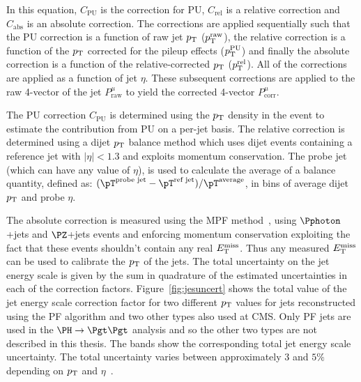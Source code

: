 In this equation, $C_{\text{PU}}$ is the correction for \ac{PU},
$C_{\text{rel}}$ is a relative correction and $C_{\text{abs}}$ is an absolute
correction. The corrections are applied sequentially such that the \ac{PU}
correction is a function of raw jet $p_{\mathrm{T}}$ ($p_{\mathrm{T}}^{\text{raw}}$),
the relative correction is a function
of the $p_{\mathrm{T}}$ corrected for the pileup effects ($p_{\mathrm{T}}^{\text{PU}}$) and finally
the absolute correction is a function of the relative-corrected $p_{\mathrm{T}}$
($p_{\mathrm{T}}^{\text{rel}}$). All of the corrections are applied as a function of
jet $\eta$. These subsequent corrections are applied to the raw
4-vector of the jet $P_{\text{raw}}^{\mu}$ to yield the corrected 4-vector
$P_{\text{corr}}^{\mu}$.

The \ac{PU} correction $C_{\text{PU}}$ is determined using the $p_{\mathrm{T}}$ density in the event to
estimate the contribution from \ac{PU} on a per-jet basis. The relative
correction is determined using a dijet $p_{\mathrm{T}}$ balance method which uses dijet
events containing a reference jet with $|\eta| < 1.3$ and exploits momentum conservation.
The probe jet (which can have any value of $\eta$), is used to calculate the
average of a balance quantity, defined as:
$(\pT^{\text{probe jet}}-\pT^{\text{ref jet}})/\pT^{\text{average}}$, in bins of
average dijet $p_{\mathrm{T}}$ and probe $\eta$.  

The absolute correction is measured
using the \ac{MPF} method~\cite{Abe:1992sj}, using $\Pphoton$+jets and $\PZ$+jets
events and enforcing momentum conservation exploiting the fact that these
events shouldn't contain any real $E_{\mathrm{T}}^{\text{miss}}$. Thus any measured $E_{\mathrm{T}}^{\text{miss}}$ can be used to
calibrate the $p_{\mathrm{T}}$ of the jets. The total uncertainty on the jet energy scale
is given by the sum in quadrature of the estimated uncertainties in each of the
correction factors. Figure~\ref{fig:jesuncert} shows the total value of the jet
energy scale correction factor for two different $p_{\mathrm{T}}$ values for jets
reconstructed using the \ac{PF} algorithm and two other types also used at CMS.
Only \ac{PF} jets are used in the $\HToTauTau$ analysis and so the other two
types are not described in this thesis. The bands show the corresponding total jet 
energy scale uncertainty. The total uncertainty varies between approximately $3$ and 
$5\%$ depending on $p_{\mathrm{T}}$ and $\eta$~\cite{CMS-JME-10-011}. 

